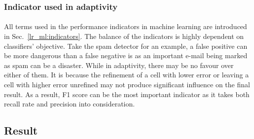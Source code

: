 \subsubsection{Indicator used in adaptivity}
\paragraph{}
All terms used in the performance indicators in machine learning are introduced in Sec.~\ref{lr_ml:indicators}.
The balance of the indicators is highly dependent on classifiers' objective.
Take the spam detector for an example, a false positive can be more dangerous than a false negative is as an important e-mail being marked as spam can be a disaster.
While in adaptivity, there may be no favour over either of them.
It is because the refinement of a cell with lower error or leaving a cell with higher error unrefined may not produce significant influence on the final result.
As a result, F1 score can be the most important indicator as it takes both recall rate and precision into consideration.


\subsection{Result}
